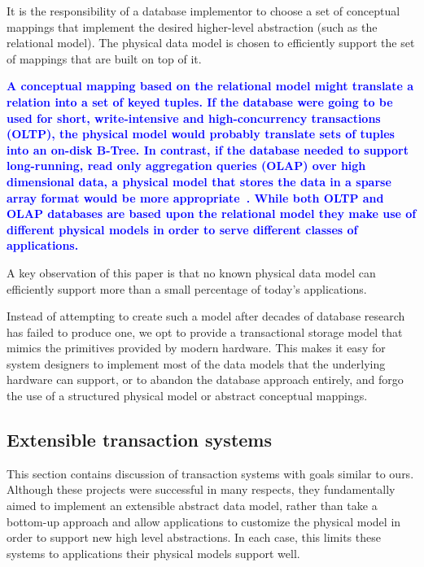 \documentclass[letterpaper,twocolumn,10pt]{article}
\newcommand{\diff}[1]{\textcolor{blue}{\bf #1}}
\begin{document}

It is the responsibility of a database implementor to choose a set of
conceptual mappings that implement the desired higher-level
abstraction (such as the relational model).  The physical data model
is chosen to efficiently support the set of mappings that are built on
top of it.

\diff{A conceptual mapping based on the relational model might
translate a relation into a set of keyed tuples.  If the database were
going to be used for short, write-intensive and high-concurrency
transactions (OLTP), the physical model would probably translate sets
of tuples into an on-disk B-Tree.  In contrast, if the database needed
to support long-running, read only aggregation queries (OLAP) over high 
dimensional data, a physical model that stores the data in a sparse array format would
be more appropriate~\cite{molap}.  While both OLTP and OLAP databases are based
upon the relational model they make use of different physical models
in order to serve different classes of applications.}

A key observation of this paper is that no known physical data model
can efficiently support more than a small percentage of today's applications.  

Instead of attempting to create such a model after decades of database
research has failed to produce one, we opt to provide a transactional
storage model that mimics the primitives provided by modern hardware.
This makes it easy for system designers to implement most of the data
models that the underlying hardware can support, or to
abandon the database approach entirely, and forgo the use of a
structured physical model or abstract conceptual mappings.

\subsection{Extensible transaction systems} 
\label{sec:otherDBs}
This section contains discussion of transaction systems with goals
similar to ours.  Although these projects were successful in many
respects, they fundamentally aimed to implement an extensible abstract
data model, rather than take a bottom-up approach and allow
applications to customize the physical model in order to support new
high level abstractions.  In each case, this limits these systems to
applications their physical models support well.
\end{document}

